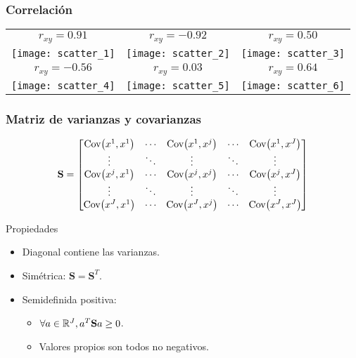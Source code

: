 \documentclass[table]{beamer}
\begin{document}
\begin{frame}
    \frametitle{Correlación}
    \begin{center}
        \begin{tabular}{ccc}
            $r_{x y} = 0.91$ &
            $r_{x y} = -0.92$ &
            $r_{x y} = 0.50$ \\
            \texttt{[image: scatter\_1]} &
            \texttt{[image: scatter\_2]} &
            \texttt{[image: scatter\_3]} \\
            $r_{x y} = -0.56$ &
            $r_{x y} = 0.03$ &
            $r_{x y} = 0.64$ \\
            \texttt{[image: scatter\_4]} &
            \texttt{[image: scatter\_5]} &
            \texttt{[image: scatter\_6]}
        \end{tabular}
    \end{center}
\end{frame}

\begin{frame}
    \frametitle{Matriz de varianzas y covarianzas}
    \begin{equation*}
        \mathbf{S} =
        \begin{bmatrix}
            \cov{x^{1} , x^{1}} & \cdots & \cov{x^{1} , x^{j}} & \cdots & \cov{x^{1} , x^{J}} \\
            \vdots & \ddots & \vdots & \ddots & \vdots \\
            \cov{x^{j} , x^{1}} & \cdots & \cov{x^{j} , x^{j}} & \cdots & \cov{x^{j} , x^{J}} \\
            \vdots & \ddots & \vdots & \ddots & \vdots \\
            \cov{x^{J} , x^{1}} & \cdots & \cov{x^{J} , x^{j}} & \cdots & \cov{x^{J} , x^{J}} \\
        \end{bmatrix}
    \end{equation*}
    \begin{block}{Propiedades}
        \begin{itemize}
            \item Diagonal contiene las varianzas.
            \item Simétrica: $\mathbf{S} = \mathbf{S}^{T}$.
            \item Semidefinida positiva:
                \begin{itemize}
                    \item $\forall a \in \mathbb{R}^{J} , a^{T} \mathbf{S} a \geq 0$.
                    \item Valores propios son todos no negativos.
                \end{itemize}
        \end{itemize}
    \end{block}
\end{frame}
\end{document}
